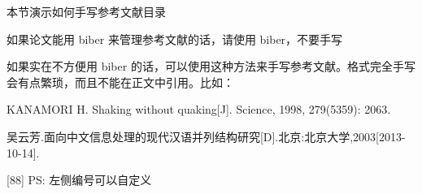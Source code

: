 \begin{manref}
\item 本节演示如何手写参考文献目录
\item 如果论文能用 biber 来管理参考文献的话，请使用 biber，不要手写
\item 如果实在不方便用 biber 的话，可以使用这种方法来手写参考文献。格式完全手写会有点繁琐，而且不能在正文中引用。比如：
\item KANAMORI H. Shaking without quaking[J]. Science, 1998, 279(5359): 2063.
\item 吴云芳.面向中文信息处理的现代汉语并列结构研究[D].北京:北京大学,2003[2013-10-14].
\item[{[88]}] PS: 左侧编号可以自定义
\end{manref}
